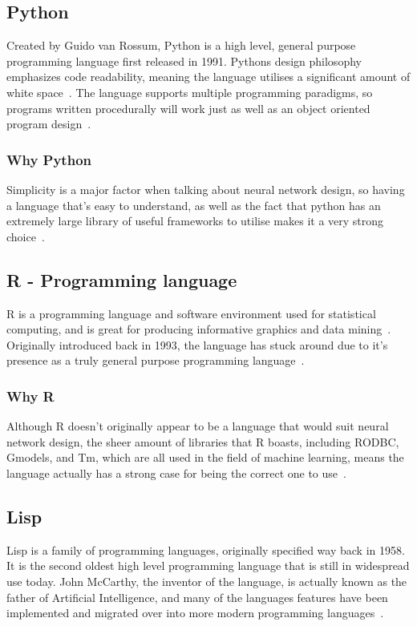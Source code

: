 \subsection{Python}
Created by Guido van Rossum, Python is a high level, general purpose programming language first released in 1991. Pythons design philosophy emphasizes code readability, meaning the language utilises a significant amount of white space~\cite{whatIsPython}. The language supports multiple programming paradigms, so programs written procedurally will work just as well as an object oriented program design~\cite{pedregosa2011scikit}.

\subsubsection{Why Python} 
Simplicity is a major factor when talking about neural network design, so having a language that's easy to understand, as well as the fact that python has an extremely large library of useful frameworks to utilise makes it a very strong choice~\cite{whatIsPythonForBeginners}.

\subsection{R - Programming language}
R is a programming language and software environment used for statistical computing, and is great for producing informative graphics and data mining~\cite{rAbout}. Originally introduced back in 1993, the language has stuck around due to it's presence as a truly general purpose programming language~\cite{hornik2009open}.

\subsubsection{Why R}
Although R doesn't originally appear to be a language that would suit neural network design, the sheer amount of libraries that R boasts, including RODBC, Gmodels, and Tm, which are all used in the field of machine learning, means the language actually has a strong case for being the correct one to use~\cite{rIntroAndBasics}.

\subsection{Lisp}
Lisp is a family of programming languages, originally specified way back in 1958. It is the second oldest high level programming language that is still in widespread use today. John McCarthy, the inventor of the language, is actually known as the father of Artificial Intelligence, and many of the languages features have been implemented and migrated over into more modern programming languages~\cite{LISPIntro}.

